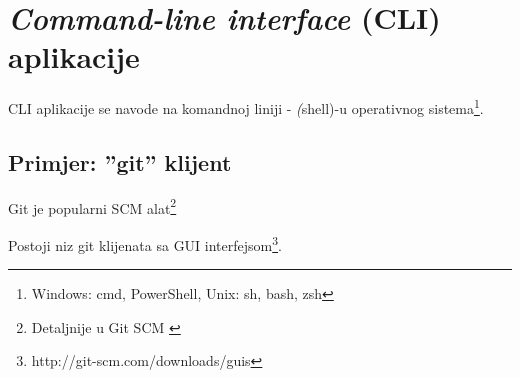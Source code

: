 \documentclass[times, utf8, seminar]{fit}
\begin{document}
%


%
%
%
%
%
%
%
%

%
%

\section{\emph{Command-line interface} (CLI) aplikacije}

CLI aplikacije se navode na komandnoj liniji - \emph(shell)-u operativnog sistema\footnote{Windows: cmd, PowerShell, Unix: sh, bash, zsh}.

\subsection{Primjer: ''git'' klijent}
\label{sec:git}

Git je popularni SCM alat\footnote{Detaljnije u Git SCM \citep{agilegit}}

Postoji niz git klijenata sa GUI interfejsom\footnote{http://git-scm.com/downloads/guis}. 
\end{document}
